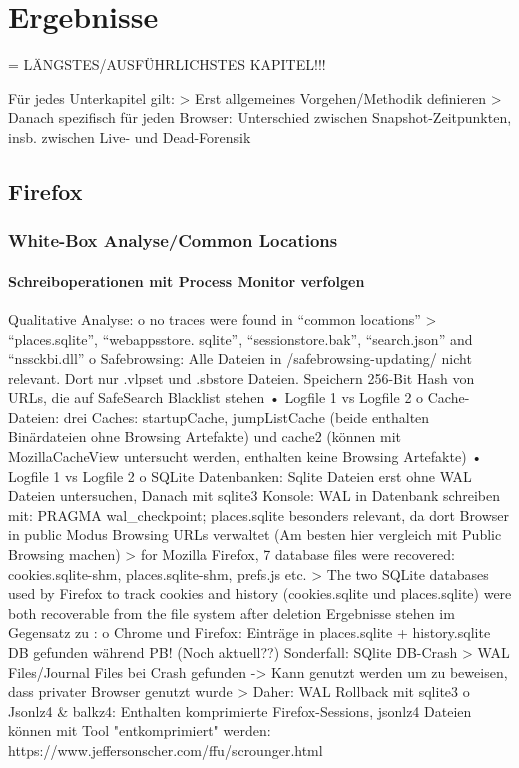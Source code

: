\chapter{Ergebnisse}

= LÄNGSTES/AUSFÜHRLICHSTES KAPITEL!!!

Für jedes Unterkapitel gilt: 
> Erst allgemeines Vorgehen/Methodik definieren
> Danach spezifisch für jeden Browser: Unterschied zwischen Snapshot-Zeitpunkten, insb. zwischen Live- und Dead-Forensik

\section{Firefox}

\subsection*{White-Box Analyse/Common Locations}

\subsubsection*{Schreiboperationen mit Process Monitor verfolgen}

Qualitative Analyse:
	o no traces were found in “common locations” \cite{Montasari.2015}
		>  “places.sqlite”, “webappsstore. sqlite”, “sessionstore.bak”, “search.json” and “nssckbi.dll”
	o	Safebrowsing: Alle Dateien in /safebrowsing-updating/ nicht relevant. Dort nur .vlpset und .sbstore Dateien. Speichern 256-Bit Hash von URLs, die auf SafeSearch Blacklist stehen 
		•	Logfile 1 vs Logfile 2
	o	Cache-Dateien: drei Caches: startupCache, jumpListCache (beide enthalten Binärdateien ohne Browsing Artefakte) und cache2 (können mit MozillaCacheView untersucht werden, enthalten keine Browsing Artefakte)
		•	Logfile 1 vs Logfile 2
	o	SQLite Datenbanken: Sqlite Dateien erst ohne WAL Dateien untersuchen, Danach mit sqlite3 Konsole: WAL in Datenbank schreiben mit: PRAGMA wal\_checkpoint; places.sqlite besonders relevant, da dort Browser in public Modus Browsing URLs verwaltet (Am besten hier vergleich mit Public Browsing machen)	
		> \cite{Fayyad.2021} for Mozilla Firefox, 7 database files were recovered: cookies.sqlite-shm, places.sqlite-shm, prefs.js etc.
		> \cite{Muir.2019} The two SQLite databases used by Firefox to track cookies and history (cookies.sqlite und places.sqlite) were both recoverable from the file system after deletion	
		Ergebnisse stehen im Gegensatz zu \cite{Hedberg.2013} :
			o	Chrome und Firefox: Einträge in places.sqlite + history.sqlite DB gefunden während PB! (Noch aktuell??)
		Sonderfall: SQlite DB-Crash \cite{Hedberg.2013}
			> WAL Files/Journal Files bei Crash gefunden -> Kann genutzt werden um zu beweisen, dass privater Browser genutzt wurde
			> Daher: WAL Rollback mit sqlite3	
	o	Jsonlz4 \& balkz4: Enthalten komprimierte Firefox-Sessions, jsonlz4 Dateien können mit Tool "entkomprimiert" werden: https://www.jeffersonscher.com/ffu/scrounger.html

